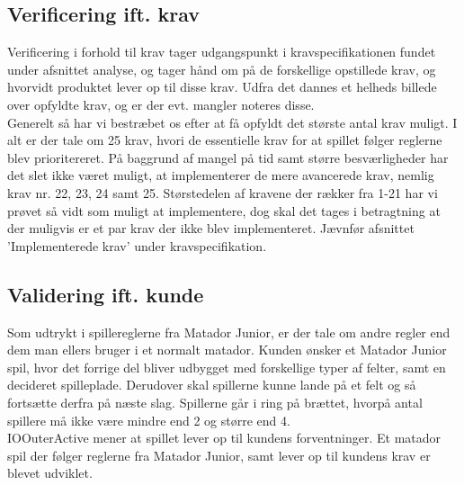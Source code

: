 \subsection{Verificering ift. krav}
Verificering i forhold til krav tager udgangspunkt i kravspecifikationen fundet under afsnittet analyse, og tager hånd om på de forskellige opstillede krav, og hvorvidt produktet lever op til disse krav. Udfra det dannes et helheds billede over opfyldte krav, og er der evt. mangler noteres disse.\\
Generelt så har vi bestræbet os efter at få opfyldt det største antal krav muligt. I alt er der tale om 25 krav, hvori de essentielle krav for at spillet følger reglerne blev prioritereret. På baggrund af mangel på tid samt større besværligheder har det slet ikke været muligt, at implementerer de mere avancerede krav, nemlig krav nr. 22, 23, 24 samt 25. Størstedelen af kravene der rækker fra 1-21 har vi prøvet så vidt som muligt at implementere, dog skal det tages i betragtning at der muligvis er et par krav der ikke blev implementeret. Jævnfør afsnittet 'Implementerede krav' under kravspecifikation.\\

\subsection{Validering ift. kunde}
Som udtrykt i spillereglerne fra Matador Junior, er der tale om andre regler end dem man ellers bruger i et normalt matador. Kunden ønsker et Matador Junior spil, hvor det forrige del bliver udbygget med forskellige typer af felter, samt en decideret spilleplade. Derudover skal spillerne kunne lande på et felt og så fortsætte derfra på næste slag. Spillerne går i ring på brættet, hvorpå antal spillere må ikke være mindre end 2 og større end 4.
\\
IOOuterActive mener at spillet lever op til kundens forventninger. Et matador spil der følger reglerne fra Matador Junior, samt lever op til kundens krav er blevet udviklet.\\